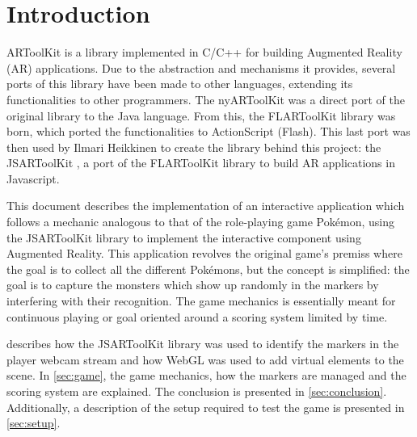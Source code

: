\section{Introduction}
\label{sec:intro}

ARToolKit is a library implemented in C/C++ for building Augmented Reality (AR) applications. Due to the abstraction and mechanisms it provides, several ports of this library have been made to other languages, extending its functionalities to other programmers. The nyARToolKit was a direct port of the original library to the Java language. From this, the FLARToolKit library was born, which ported the functionalities to ActionScript (Flash). This last port was then used by Ilmari Heikkinen to create the library behind this project: the JSARToolKit \cite{jsartoolkit}, a port of the FLARToolKit library to build AR applications in Javascript.

This document describes the implementation of an interactive application which follows a mechanic analogous to that of the role-playing game Pokémon\textregistered, using the JSARToolKit library to implement the interactive component using Augmented Reality. This application revolves the original game's premiss where the goal is to collect all the different Pokémons, but the concept is simplified: the goal is to capture the monsters which show up randomly in the markers by interfering with their recognition. The game mechanics is essentially meant for continuous playing or goal oriented around a scoring system limited by time.

 describes how the JSARToolKit library was used to identify the markers in the player webcam stream and how WebGL was used to add virtual elements to the scene. In \cref{sec:game}, the game mechanics, how the markers are managed and the scoring system are explained. The conclusion is presented in \cref{sec:conclusion}. Additionally, a description of the setup required to test the game is presented in \cref{sec:setup}.